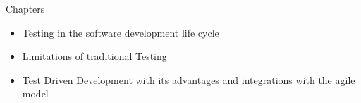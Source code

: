 Chapters
\begin{itemize}
    \item Testing in the software development life cycle
    \item Limitations of traditional Testing
    \item Test Driven Development with its advantages and integrations with the agile model
\end{itemize}